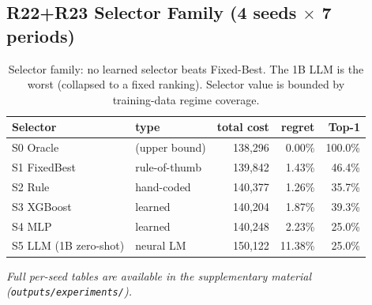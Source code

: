 \documentclass[11pt,a4paper]{article}
\begin{document}
\subsection{R22+R23 Selector Family (4 seeds $\times$ 7 periods)}

\begin{table}[H]
\centering
\small
\begin{tabular}{l l r r r}
\toprule
Selector & type & total cost & regret & Top-1 \\
\midrule
S0 Oracle & (upper bound) & 138,296 & 0.00\% & 100.0\% \\
S1 FixedBest & rule-of-thumb & 139,842 & 1.43\% & 46.4\% \\
S2 Rule & hand-coded & 140,377 & 1.26\% & 35.7\% \\
S3 XGBoost & learned & 140,204 & 1.87\% & 39.3\% \\
S4 MLP & learned & 140,248 & 2.23\% & 25.0\% \\
S5 LLM (1B zero-shot) & neural LM & 150,122 & 11.38\% & 25.0\% \\
\bottomrule
\end{tabular}
\caption{Selector family: no learned selector beats Fixed-Best. The
1B LLM is the worst (collapsed to a fixed ranking). Selector value is
bounded by training-data regime coverage. \label{tab:r22}}
\end{table}

\noindent\emph{Full per-seed tables are available in the supplementary
material (\texttt{outputs/experiments/}).}
\end{document}
